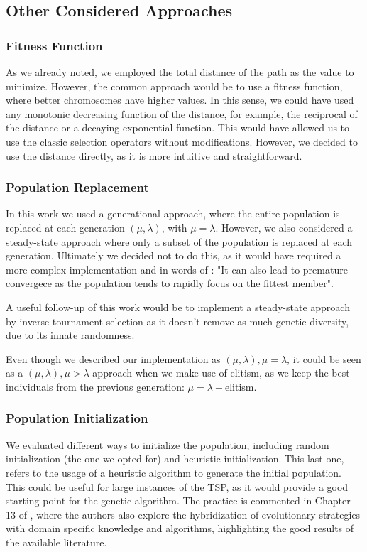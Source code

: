 \documentclass[11pt]{article}
\begin{document}
\subsection{Other Considered Approaches}
\subsubsection{Fitness Function}
As we already noted, we employed the total distance of the path as the value to minimize. However, the common approach would be to use a fitness function, where better chromosomes have higher values. In this sense, we could have used any monotonic decreasing function of the distance, for example, the reciprocal of the distance or a decaying exponential function. This would have allowed us to use the classic selection operators without modifications. However, we decided to use the distance directly, as it is more intuitive and straightforward.

\subsubsection{Population Replacement}
In this work we used a generational approach, where the entire population is replaced at each generation $(\mu,\lambda)$, with  $\mu=\lambda$. However, we also considered a steady-state approach where only a subset of the population is replaced at each generation. Ultimately we decided not to do this, as it would have required a more complex implementation and in words of \cite{Eiben2003}: "It can also lead to premature convergece as the population tends to rapidly focus on the fittest member". 

A useful follow-up of this work would be to implement a steady-state approach by inverse tournament selection as it doesn't remove as much genetic diversity, due to its innate randomness.

Even though we described our implementation as $(\mu,\lambda), \mu=\lambda$, it could be seen as a $(\mu,\lambda), \mu>\lambda$ approach when we make use of elitism, as we keep the best individuals from the previous generation: $\mu=\lambda+\text{elitism}$.


\subsubsection{Population Initialization}
We evaluated different ways to initialize the population, including random initialization (the one we opted for) and heuristic initialization. This last one, refers to the usage of a heuristic algorithm to generate the initial population. This could be useful for large instances of the TSP, as it would provide a good starting point for the genetic algorithm. The practice is commented in Chapter 13 of \cite{Back2000}, where the authors also explore the hybridization of evolutionary strategies with domain specific knowledge and algorithms, highlighting the good results of the available literature.
\end{document}
